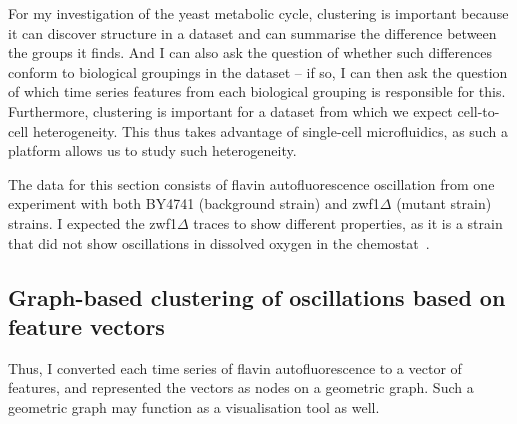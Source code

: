 For my investigation of the yeast metabolic cycle, clustering is important because it can discover structure in a dataset and can summarise the difference between the groups it finds.
And I can also ask the question of whether such differences conform to biological groupings in the dataset -- if so, I can then ask the question of which time series features from each biological grouping is responsible for this.
Furthermore, clustering is important for a dataset from which we expect cell-to-cell heterogeneity.
This thus takes advantage of single-cell microfluidics, as such a platform allows us to study such heterogeneity.

The data for this section consists of flavin autofluorescence oscillation from one experiment with both BY4741 (background strain) and zwf1$\Delta$ (mutant strain) strains.
I expected the zwf1$\Delta$ traces to show different properties, as it is a strain that did not show oscillations in dissolved oxygen in the chemostat~\parencite{tuCyclicChangesMetabolic2007}.


\subsection{Graph-based clustering of oscillations based on feature vectors}
\label{subsec:analysis-clustering-graphclustering}

Thus, I converted each time series of flavin autofluorescence to a vector of features, and represented the vectors as nodes on a geometric graph.
Such a geometric graph may function as a visualisation tool as well.


